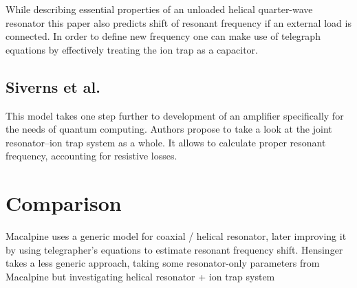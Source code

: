 While describing essential properties of an unloaded helical quarter-wave resonator this paper \cite{Macalpine2000} also predicts shift of resonant frequency if an external load is connected. In order to define new frequency one can make use of telegraph equations \cite{Rohde2009} by effectively treating the ion trap as a capacitor.

\subsection{Siverns et al.}
This model \cite{Siverns2012} takes one step further to development of an amplifier specifically for the needs of quantum computing. Authors propose to take a look at the joint resonator--ion trap system as a whole. It allows to calculate proper resonant frequency, accounting for resistive losses.


\section{Comparison}

Macalpine uses a generic model for coaxial / helical resonator, later improving it by using telegrapher's equations to estimate resonant frequency shift. Hensinger takes a less generic approach, taking some resonator-only parameters from Macalpine but investigating helical resonator + ion trap system